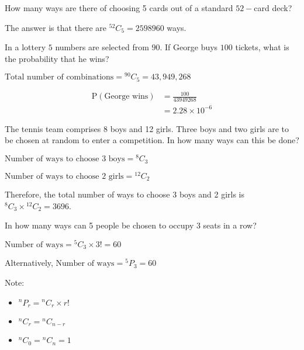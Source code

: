 \documentclass[11pt,a4paper]{book}
\begin{document}
How many ways are there of choosing 5 cards out of a standard $52-$card deck?

The answer is that there are $^{52}C_{5}=2598960$ ways. 

\begin{example}

In a lottery $5$ numbers are selected from $90$. If George buys
$100$ tickets, what is the probability that he wins?

\Solution

$\text{Total number of combinations}={}^{90}C_{5}=43,949,268$

\begin{align*}
\text{P}\left(\text{George wins}\right) & =\frac{100}{43949268}\\
 & =2.28\times10^{-6}
\end{align*}

\end{example}

\begin{example}

The tennis team comprises 8 boys and 12 girls. Three boys and two
girls are to be chosen at random to enter a competition. In how many
ways can this be done?


\Solution


$\text{Number of ways to choose 3 boys}={}^{8}C_{3}$

$\text{Number of ways to choose 2 girls}={}^{12}C_{2}$

Therefore, the total number of ways to choose 3 boys and 2 girls is
$^{8}C_{3}\times{}^{12}C_{2}=3696$.


\end{example}

\begin{example}

In how many ways can 5 people be chosen to occupy 3 seats in a row?

\Solution

$\text{Number of ways}={}^{5}C_{3}\times3!=60$

Alternatively, $\text{Number of ways}={}^{5}P_{3}=60$
\end{example}


Note:
\begin{itemize}
\item $^{n}P_{r}={}^{n}C_{r}\times r!$
\item $^{n}C_{r}={}^{n}C_{n-r}$ 
\item $^{n}C_{0}={}^{n}C_{n}=1$
\end{itemize}
\end{document}
